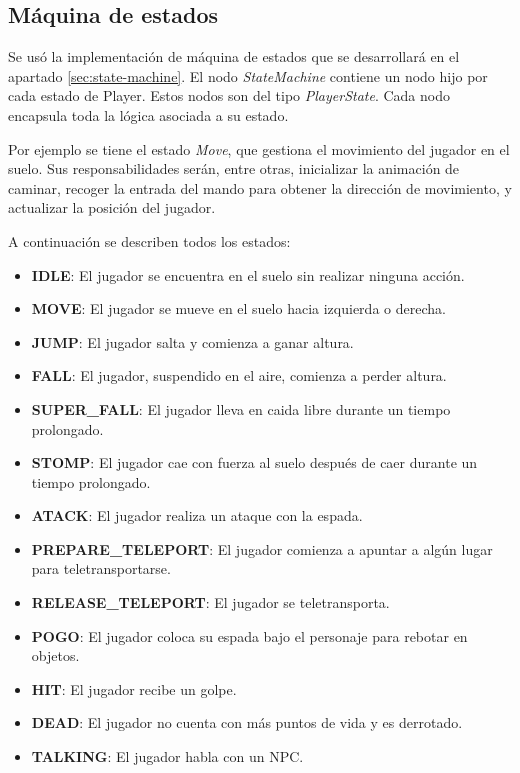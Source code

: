 \subsection{Máquina de estados}

Se usó la implementación de máquina de estados que se desarrollará en el apartado \ref{sec:state-machine}. El nodo \textit{StateMachine} contiene un nodo hijo por cada estado de Player. Estos nodos son del tipo \textit{PlayerState}. Cada nodo encapsula toda la lógica asociada a su estado. 

Por ejemplo se tiene el estado \textit{Move}, que gestiona el movimiento del jugador en el suelo. Sus responsabilidades serán, entre otras, inicializar la animación de caminar, recoger la entrada del mando para obtener la dirección de movimiento, y actualizar la posición del jugador.

A continuación se describen todos los estados:
\begin{itemize}
    \item \textbf{IDLE}: El jugador se encuentra en el suelo sin realizar ninguna acción.
    \item \textbf{MOVE}: El jugador se mueve en el suelo hacia izquierda o derecha.
    \item \textbf{JUMP}: El jugador salta y comienza a ganar altura.
    \item \textbf{FALL}: El jugador, suspendido en el aire, comienza a perder altura.
    \item \textbf{SUPER\_FALL}: El jugador lleva en caida libre durante un tiempo prolongado.
    \item \textbf{STOMP}: El jugador cae con fuerza al suelo después de caer durante un tiempo prolongado.
    \item \textbf{ATACK}: El jugador realiza un ataque con la espada.
    \item \textbf{PREPARE\_TELEPORT}: El jugador comienza a apuntar a algún lugar para teletransportarse.
    \item \textbf{RELEASE\_TELEPORT}: El jugador se teletransporta.
    \item \textbf{POGO}: El jugador coloca su espada bajo el personaje para rebotar en objetos.
    \item \textbf{HIT}: El jugador recibe un golpe.
    \item \textbf{DEAD}: El jugador no cuenta con más puntos de vida y es derrotado.
    \item \textbf{TALKING}: El jugador habla con un NPC.
\end{itemize}

